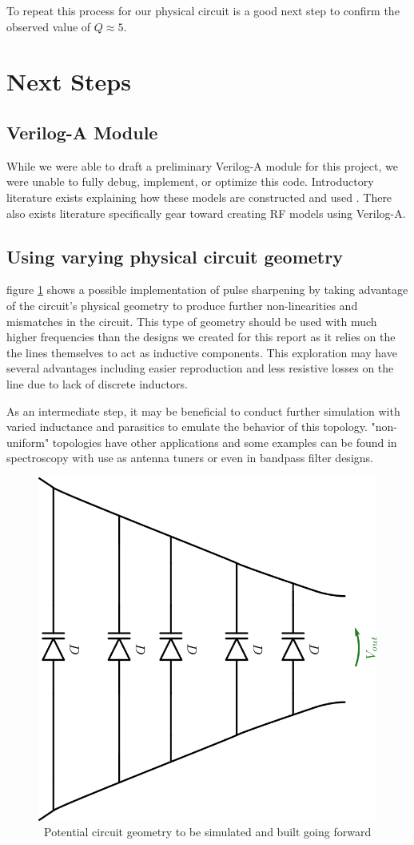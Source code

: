 \documentclass[journal]{IEEEtran} \usepackage[english]{babel}
\begin{document}
To repeat this process for our physical circuit is a good next step to confirm
the observed value of $Q \approx 5$.

\section{Next Steps}\label{sec:NextSteps}



\subsection{Verilog-A Module}

While we were able to draft a preliminary Verilog-A module for this project,
we were unable to fully debug, implement, or optimize this code.
Introductory literature exists explaining how these models are constructed
and used \cite{VerilogAFun}. There also exists literature specifically gear
toward creating RF models using Verilog-A\cite{VerilogARF}.
    
    




\subsection{Using varying physical circuit geometry}

figure \ref{fig:WeirdGeo} shows a possible implementation of pulse sharpening by
taking advantage of the circuit's physical geometry to produce further
non-linearities and mismatches in the circuit. This type of geometry should be
used with much higher frequencies than the designs we created for this report as
it relies on the the lines themselves to act as inductive components. This 
exploration may have several advantages including easier reproduction and less
resistive losses on the line due to lack of discrete inductors.

As an intermediate step, it may be beneficial to conduct further simulation with
varied inductance and parasitics to emulate the behavior of this topology.
"non-uniform" topologies have other applications and some examples can be found
in spectroscopy\cite{palmer2014performance} with use as antenna
tuners\cite{cure2012non} or even in bandpass filter
designs\cite{NonUniformBandpass}.


\begin{figure}[htb]
\centering
\includegraphics[width=0.45\linewidth]{WeirdNTLTGeometry.png}
\caption{\ Potential circuit geometry to be simulated and built going forward
}\label{fig:WeirdGeo}
\end{figure}
\end{document}
